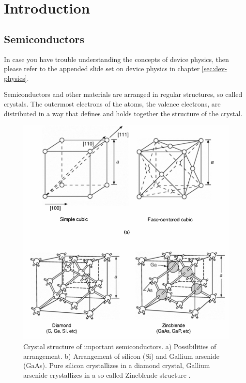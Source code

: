 \documentclass[main]{subfiles}
\begin{document}
\section{Introduction}

\subsection{Semiconductors}
In case you have trouble understanding the concepts of device physics, then please refer to the appended slide set on device physics in chapter \ref{sec:dev-physics}.

Semiconductors and other materials are arranged in regular structures, so called crystals. The outermost electrons of the atoms, the valence electrons, are distributed in a way that defines and holds together the structure of the crystal.

\begin{figure}[H]
\centering
\includegraphics[scale=0.3]{figs/crystal_structure.png}
\caption{Crystal structure of important semiconductors. a) Possibilities of arrangement. b) Arrangement of silicon (Si) and Gallium arsenide (GaAs). Pure silicon crystallizes in a diamond crystal, Gallium arsenide crystallizes in a so called Zincblende structure \cite{book:VLSI}.}
\end{figure}
\end{document}
